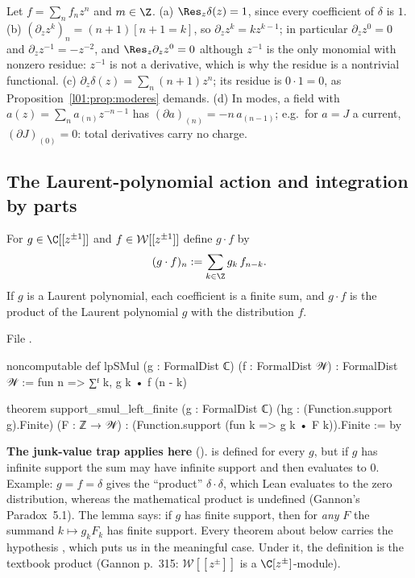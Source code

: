 \begin{example}\label{l01:ex:calibrate}
Let $f = \sum_{n}f_nz^n$ and $m\in\Z$.
(a) $\Res_z\delta(z) = 1$, since every coefficient of $\delta$ is $1$.
(b) $(\partial_z z^{k})_n = (n+1)[n+1 = k]$, so $\partial_zz^k = kz^{k-1}$; in particular
$\partial_zz^{0} = 0$ and $\partial_z z^{-1} = -z^{-2}$, and $\Res_z\partial_z z^{0} = 0$ although
$z^{-1}$ is the only monomial with nonzero residue: $z^{-1}$ is not a derivative, which is why the residue
is a nontrivial functional.
(c) $\partial_z\delta(z) = \sum_n(n+1)z^n$; its residue is $0\cdot1 = 0$, as
Proposition~\ref{l01:prop:moderes} demands.
(d) In modes, a field with $a(z) = \sum_na_{(n)}z^{-n-1}$ has $(\partial a)_{(n)} = -n\,a_{(n-1)}$; e.g.\ for
$a = J$ a current, $(\partial J)_{(0)} = 0$: total derivatives carry no charge.
\end{example}

\subsection{The Laurent-polynomial action and integration by parts}

\begin{definition}\label{l01:def:lpsmul}
For $g\in\C[[z^{\pm1}]]$ and $f\in\mathcal{W}[[z^{\pm1}]]$ define $g\cdot f$ by
\begin{equation*}
  (g\cdot f)_n := \sum_{k\in\Z}g_k\,f_{n-k}.
\end{equation*}
If $g$ is a Laurent polynomial, each coefficient is a finite sum, and $g\cdot f$ is the product of the
Laurent polynomial $g$ with the distribution $f$.
\end{definition}

\noindent File .
\begin{leancode}
noncomputable def lpSMul (g : FormalDist ℂ) (f : FormalDist 𝒲) : FormalDist 𝒲 :=
  fun n => ∑ᶠ k, g k • f (n - k)

theorem support_smul_left_finite (g : FormalDist ℂ) (hg : (Function.support g).Finite)
    (F : ℤ → 𝒲) : (Function.support (fun k => g k • F k)).Finite := by
\end{leancode}

\begin{dictionary}
\textbf{The junk-value trap applies here} ().  is defined for
every $g$, but if $g$ has infinite support the sum  may have infinite support and
then evaluates to $0$. Example: $g = f = \delta$ gives the ``product'' $\delta\cdot\delta$, which Lean
evaluates to the zero distribution, whereas the mathematical product is undefined (Gannon's Paradox~5.1).
The lemma  says: if $g$ has finite support, then for \emph{any} $F$ the summand
$k\mapsto g_kF_k$ has finite support. Every theorem about  below carries the hypothesis
, which puts us in the meaningful case. Under it, the definition is
the textbook product (Gannon p.~315: $\mathcal W[[z^{\pm}]]$ is a $\C[z^{\pm}]$-module).
\end{dictionary}

